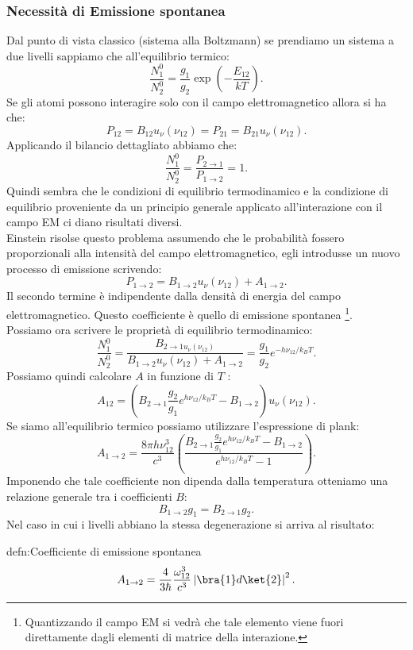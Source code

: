 \subsubsection{Necessità di Emissione spontanea}%
Dal punto di vista classico (sistema alla Boltzmann) se prendiamo un sistema a due livelli sappiamo che all'equilibrio termico:
\[
    \frac{N_1^0}{N_2^0}= \frac{g_1}{g_2}\exp\left(-\frac{E_{12}}{kT}\right)
.\] 
Se gli atomi possono interagire solo con il campo elettromagnetico allora si ha che:
\[
    P_{12} = B_{12}u_{\nu}(\nu_{12}) =P_{21}=B_{21}u_{\nu}(\nu_{12}) 
.\] 
Applicando il bilancio dettagliato abbiamo che:
\[
\frac{N_1^0}{N_2^0} = \frac{P_{2\to 1}}{P_{1\to 2}} = 1
.\] 
Quindi sembra che le condizioni di equilibrio termodinamico e la condizione di equilibrio proveniente da un principio generale applicato all'interazione con il campo EM ci diano risultati diversi. \\
Einstein risolse questo problema assumendo che le probabilità fossero proporzionali alla intensità del campo elettromagnetico, egli introdusse un nuovo processo di emissione scrivendo:
\[
    P_{1\to 2}= B_{1\to 2}u_{\nu}(\nu_{12})  + A_{1\to 2}
.\] 
Il secondo termine è indipendente dalla densità di energia del campo elettromagnetico. Questo coefficiente è quello di emissione spontanea \footnote{Quantizzando il campo EM si vedrà che tale elemento viene fuori direttamente dagli elementi di matrice della interazione.}.\\
Possiamo ora scrivere le proprietà di equilibrio termodinamico:
\[
    \frac{N_1^0}{N_2^0} = \frac{B_{2\to 1 u_\nu(\nu_{12})}}{B_{1\to 2}u_\nu(\nu_{12}) + A_{1\to 2}} = \frac{g_1}{g_2}e^{-h\nu_{12} /k_BT}
.\] 
Possiamo quindi calcolare $A$  in funzione di $T$  :
\[
    A_{12} = \left(B_{2\to 1}\frac{g_2}{g_1}e^{h\nu_{12} /k_BT}-B_{1\to 2}\right)u_\nu(\nu_{12}) 
.\] 
Se siamo all'equilibrio termico possiamo utilizzare l'espressione di plank:
\[
A_{1\to 2} =
\frac{8\pi h\nu_{12}^3}{c^3}\left(\frac{B_{2\to 1}\frac{g_2}{g_1}e^{h\nu_{12} /k_BT}-B_{1\to 2}}{e^{h\nu_{12} /k_BT}-1}\right)
.\] 
Imponendo che tale coefficiente non dipenda dalla temperatura otteniamo una relazione generale tra i coefficienti $B$:
\[
B_{1\to 2}g_1=B_{2\to 1}g_2
.\] 
Nel caso in cui i livelli abbiano la stessa degenerazione si arriva al risultato:
\begin{defn}{defn:Coefficiente di emissione spontanea}
\[
A_{1\to 2}=\frac{4}{3\hbar }\frac{\omega_{12}^3}{c ^3}\left|\bra{1}d\ket{2}\right|^2
.\] 
\end{defn}
